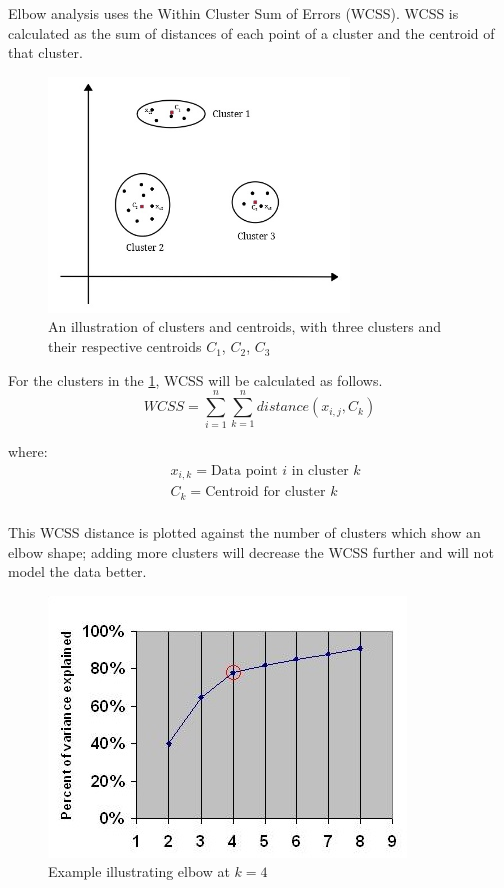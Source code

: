 Elbow analysis uses the Within Cluster Sum of Errors (WCSS). WCSS is calculated as the sum of distances of each point of a cluster and the centroid of that cluster. 

\begin{figure}[!ht]
    \centering
    \includegraphics[width=8cm,keepaspectratio]{pics/Elbow.jpg}
     \captionsetup{justification=centering,margin=2cm}
    \caption{An illustration of clusters and centroids, with three clusters and their respective centroids $C_{1}$, $C_{2}$, $C_{3}$}
    \label{fig:elbow}
\end{figure}

For the clusters in the \ref{fig:elbow}, WCSS will be calculated as follows.
\begin{equation}
   WCSS = \sum_{i=1 }^{n}\sum_{k=1}^{n}distance(x_{i,j},C_{k})
\end{equation}

where:
\begin{align*}
      & x_{i,k}=\text{Data point $i$ in cluster $k$}\\
      & C_{k}=\text{Centroid for cluster $k$}\\
\end{align*}

This WCSS distance is plotted against the number of clusters which show an elbow shape; adding more clusters will decrease the WCSS further and will not model the data better. 

\begin{figure}[!ht]
    \centering
    \includegraphics{pics/elbow_at_4.jpg}
     \captionsetup{justification=centering,margin=2cm}
    \caption{Example illustrating elbow at $k =4$ }
    \label{fig:elbow_at_4}
\end{figure}

